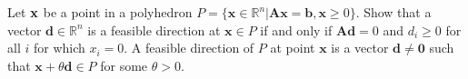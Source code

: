
Let $\bf x$ be a point in a polyhedron $P=\{ \mathbf{x}\in\mathbb{R}^n| \mathbf{Ax}=\mathbf{b},\mathbf{x}\geq0\}$. Show that a vector $\mathbf{d}\in\mathbb{R}^n$ is a feasible direction at $\mathbf{x}\in P$ if and only if $\mathbf{Ad}=0$ and $d_i\geq0$ for all $i$ for which $x_i=0$.  A feasible direction of $P$ at point $\mathbf{x}$ is a vector $\mathbf{d} \neq \mathbf{0}$ such that $\mathbf{x}+\theta \mathbf{d}\in P$ for some $\theta>0$.
